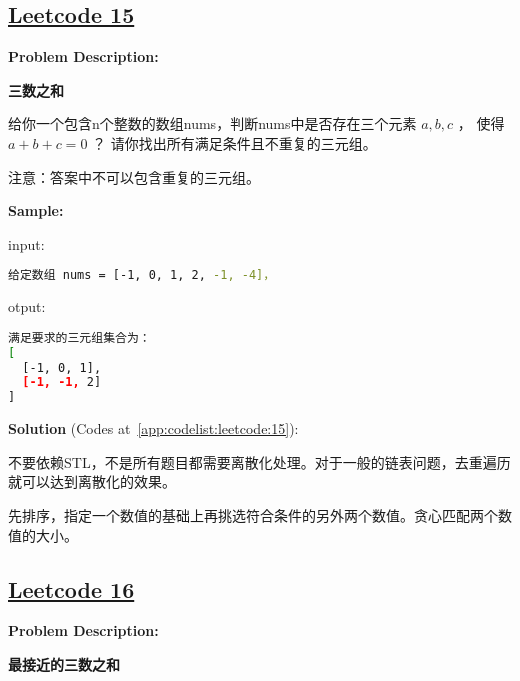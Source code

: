 \subsection{\href{https://leetcode-cn.com/}{Leetcode 15}}\label{app:problemlist:leetcode:15}

\textbf{Problem Description:}\par

\textbf{三数之和}\par

给你一个包含n个整数的数组nums，判断nums中是否存在三个元素 $ a, b, c $ ，
使得 $ a + b + c = 0 $ ？
请你找出所有满足条件且不重复的三元组。\par

注意：答案中不可以包含重复的三元组。\par


\textbf{Sample:}\par

input:\par

\begin{lstlisting}[language=bash]
给定数组 nums = [-1, 0, 1, 2, -1, -4]，
\end{lstlisting}

otput:\par

\begin{lstlisting}[language=bash]
满足要求的三元组集合为：
[
  [-1, 0, 1],
  [-1, -1, 2]
]
\end{lstlisting}

\textbf{Solution }(Codes at~\ref{app:codelist:leetcode:15}):\par

不要依赖STL，不是所有题目都需要离散化处理。对于一般的链表问题，去重遍历就可以达到离散化的效果。\par

先排序，指定一个数值的基础上再挑选符合条件的另外两个数值。贪心匹配两个数值的大小。\par



\subsection{\href{https://leetcode-cn.com/}{Leetcode 16}}\label{app:problemlist:leetcode:16}

\textbf{Problem Description:}\par

\textbf{最接近的三数之和}\par

